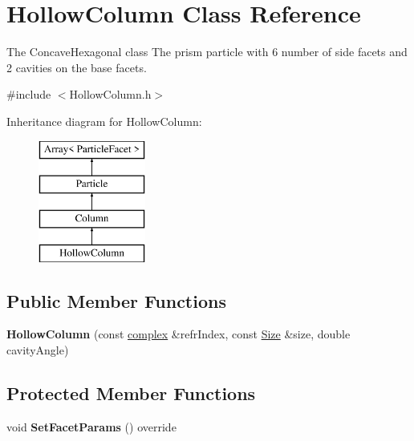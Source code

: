 \hypertarget{class_hollow_column}{}\section{Hollow\+Column Class Reference}
\label{class_hollow_column}


The Concave\+Hexagonal class The prism particle with 6 number of side facets and 2 cavities on the base facets.  




{\ttfamily \#include $<$Hollow\+Column.\+h$>$}

Inheritance diagram for Hollow\+Column\+:\begin{figure}[H]
\begin{center}
\leavevmode
\includegraphics[height=4.000000cm]{class_hollow_column}
\end{center}
\end{figure}
\subsection*{Public Member Functions}
\begin{DoxyCompactItemize}
\item 
\mbox{\label{class_hollow_column_ac03a1b9311904c85ffe890ec794401c1}} 
{\bfseries Hollow\+Column} (const \mbox{\hyperlink{classcomplex}{complex}} \&refr\+Index, const \mbox{\hyperlink{struct_size}{Size}} \&size, double cavity\+Angle)
\end{DoxyCompactItemize}
\subsection*{Protected Member Functions}
\begin{DoxyCompactItemize}
\item 
\mbox{\label{class_hollow_column_a91310788744ca94657fd8d483f955ccf}} 
void {\bfseries Set\+Facet\+Params} () override
\end{DoxyCompactItemize}
